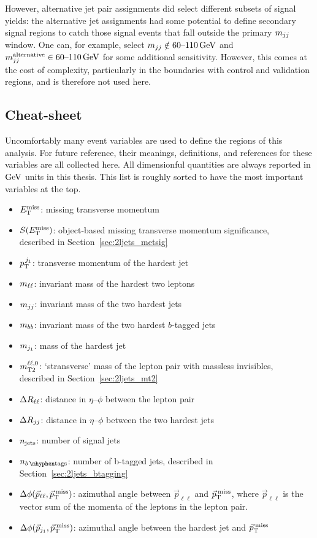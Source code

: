 However, alternative jet pair assignments did select different subsets of
signal yields:
the alternative jet assignments had some potential to define secondary signal
regions to catch those signal events that fall outside the primary
$\mjj$ window.
One can, for example, select $\mjj \notin 60\textrm{--}110\,\eV[G]$ and
$\mjj^\mathrm{alternative} \in 60\textrm{--}110\,\eV[G]$ for some additional
sensitivity.
However, this comes at the cost of complexity, particularly in the boundaries
with control and validation regions, and is therefore not used here.


\subsection{Cheat-sheet}
\label{sec:2ljets_cheatsheet}
Uncomfortably many event variables are used to define the regions of this
analysis.
For future reference, their meanings, definitions, and references for these
variables are all collected here.
All dimensionful quantities are always reported in $\eV[G]$ units in this
thesis.
This list is roughly sorted to have the most important variables at the top.
\begin{itemize}
\item $\met$: missing transverse momentum
\item $\metsig$: object-based missing transverse momentum significance,\\
described in Section~\ref{sec:2ljets_metsig}
\item $\ptjone$: transverse momentum of the hardest jet%
\vspace{0.5em}
\item $\mll$: invariant mass of the hardest two leptons
\item $\mjj$: invariant mass of the two hardest jets
\item $\mbb$: invariant mass of the two hardest $b$-tagged jets
\item $\mjetone$: mass of the hardest jet
\item $\mttwoll$: `stransverse' mass of the lepton pair with massless
invisibles,\\
described in Section~\ref{sec:2ljets_mt2}
\vspace{0.5em}
\item $\rll$: distance in $\eta\textrm{--}\phi$ between the lepton pair
\item $\rjj$: distance in $\eta\textrm{--}\phi$ between the two hardest jets%
\vspace{0.5em}
\item $\njet$: number of signal jets
\item $\nbtag$: number of b-tagged jets,
described in Section~\ref{sec:2ljets_btagging}
\vspace{0.5em}
\item $\dphillmet$: azimuthal angle between $\vec p_{\ell\ell}$ and $\ptmiss$,
where $\vec p_{\ell\ell}$ is the vector sum of the momenta of the leptons in
the lepton pair.
\item $\dphijmet$: azimuthal angle between the hardest jet and $\ptmiss$
\end{itemize}
